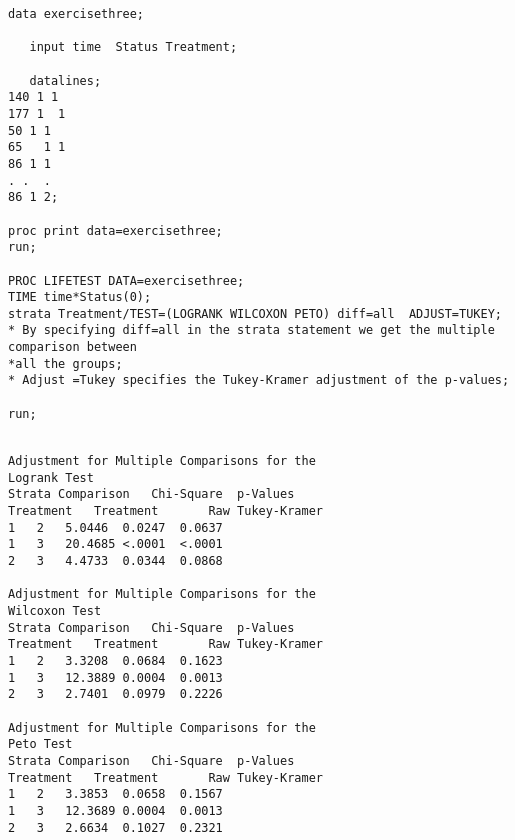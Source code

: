 \documentclass[11pt]{article}
\numberwithin{figure}{section}
\begin{document}
\begin{verbatim}
data exercisethree;
   
   input time  Status Treatment;

   datalines;
140 1 1
177 1  1
50 1 1
65   1 1
86 1 1
. .  .
86 1 2;

proc print data=exercisethree;
run;

PROC LIFETEST DATA=exercisethree;
TIME time*Status(0);
strata Treatment/TEST=(LOGRANK WILCOXON PETO) diff=all  ADJUST=TUKEY;
* By specifying diff=all in the strata statement we get the multiple  comparison between 
*all the groups;
* Adjust =Tukey specifies the Tukey-Kramer adjustment of the p-values;

run;


\end{verbatim}


\begin{verbatim}
Adjustment for Multiple Comparisons for the
Logrank Test
Strata Comparison	Chi-Square	p-Values
Treatment	Treatment		Raw	Tukey-Kramer
1	2	5.0446	0.0247	0.0637
1	3	20.4685	<.0001	<.0001
2	3	4.4733	0.0344	0.0868

Adjustment for Multiple Comparisons for the
Wilcoxon Test
Strata Comparison	Chi-Square	p-Values
Treatment	Treatment		Raw	Tukey-Kramer
1	2	3.3208	0.0684	0.1623
1	3	12.3889	0.0004	0.0013
2	3	2.7401	0.0979	0.2226

Adjustment for Multiple Comparisons for the
Peto Test
Strata Comparison	Chi-Square	p-Values
Treatment	Treatment		Raw	Tukey-Kramer
1	2	3.3853	0.0658	0.1567
1	3	12.3689	0.0004	0.0013
2	3	2.6634	0.1027	0.2321


\end{verbatim}

\newpage
\end{document}
